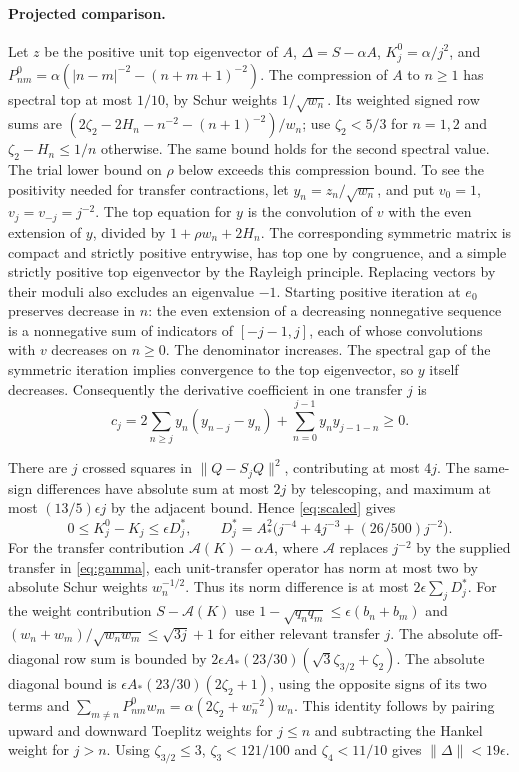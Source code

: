 \documentclass[11pt]{article}
\begin{document}
\paragraph{Projected comparison.}
Let $z$ be the positive unit top eigenvector of $A$, $\Delta=S-\alpha A$, $K^0_j=\alpha/j^2$, and $P^0_{nm}=\alpha(|n-m|^{-2}-(n+m+1)^{-2})$. The compression of $A$ to $n\ge1$ has spectral top at most $1/10$, by Schur weights $1/\sqrt{w_n}$. Its weighted signed row sums are $(2\zeta_2-2H_n-n^{-2}-(n+1)^{-2})/w_n$; use $\zeta_2<5/3$ for $n=1,2$ and $\zeta_2-H_n\le1/n$ otherwise. The same bound holds for the second spectral value. The trial lower bound on $\rho$ below exceeds this compression bound. To see the positivity needed for transfer contractions, let $y_n=z_n/\sqrt{w_n}$, and put $v_0=1$, $v_j=v_{-j}=j^{-2}$. The top equation for $y$ is the convolution of $v$ with the even extension of $y$, divided by $1+\rho w_n+2H_n$. The corresponding symmetric matrix is compact and strictly positive entrywise, has top one by congruence, and a simple strictly positive top eigenvector by the Rayleigh principle. Replacing vectors by their moduli also excludes an eigenvalue $-1$. Starting positive iteration at $e_0$ preserves decrease in $n$: the even extension of a decreasing nonnegative sequence is a nonnegative sum of indicators of $[-j-1,j]$, each of whose convolutions with $v$ decreases on $n\ge0$. The denominator increases. The spectral gap of the symmetric iteration implies convergence to the top eigenvector, so $y$ itself decreases. Consequently the derivative coefficient in one transfer $j$ is
\[
 c_j=2\sum_{n\ge j}y_n(y_{n-j}-y_n)+\sum_{n=0}^{j-1}y_ny_{j-1-n}\ge0.
\]

There are $j$ crossed squares in $\|Q-S_jQ\|^2$, contributing at most $4j$. The same-sign differences have absolute sum at most $2j$ by telescoping, and maximum at most $(13/5)\epsilon j$ by the adjacent bound. Hence \eqref{eq:scaled} gives
\[
 0\le K_j^0-K_j\le\epsilon D_j^*,\qquad D_j^*=A_*^2\big(j^{-4}+4j^{-3}+(26/500)j^{-2}\big).
\]
For the transfer contribution $\mathcal A(K)-\alpha A$, where $\mathcal A$ replaces $j^{-2}$ by the supplied transfer in \eqref{eq:gamma}, each unit-transfer operator has norm at most two by absolute Schur weights $w_n^{-1/2}$. Thus its norm difference is at most $2\epsilon\sum_j D_j^*$. For the weight contribution $S-\mathcal A(K)$ use $1-\sqrt{q_nq_m}\le\epsilon(b_n+b_m)$ and $(w_n+w_m)/\sqrt{w_nw_m}\le\sqrt{3j}+1$ for either relevant transfer $j$. The absolute off-diagonal row sum is bounded by $2\epsilon A_*(23/30)(\sqrt3\zeta_{3/2}+\zeta_2)$. The absolute diagonal bound is $\epsilon A_*(23/30)(2\zeta_2+1)$, using the opposite signs of its two terms and $\sum_{m\ne n}P^0_{nm}w_m=\alpha(2\zeta_2+w_n^{-2})w_n$. This identity follows by pairing upward and downward Toeplitz weights for $j\le n$ and subtracting the Hankel weight for $j>n$. Using $\zeta_{3/2}\le3$, $\zeta_3<121/100$ and $\zeta_4<11/10$ gives $\|\Delta\|<19\epsilon$.
\end{document}
